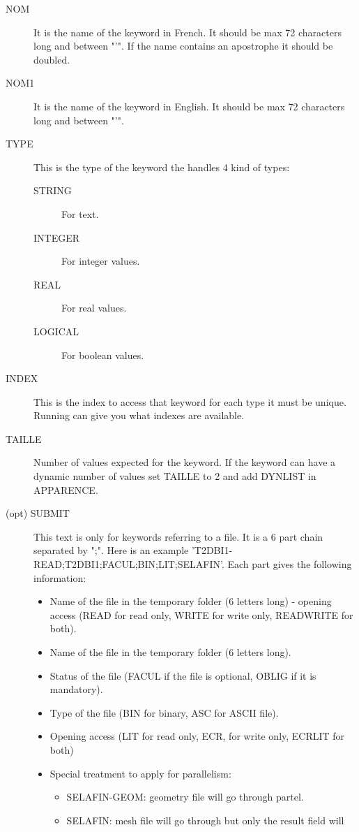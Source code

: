 \begin{description}
\item[NOM] It is the name of the keyword in French. It should be max 72
  characters long and between "'". If the name contains an apostrophe it should
  be doubled.
\item[NOM1] It is the name of the keyword in English. It should be max 72
  characters long and between "'".
\item[TYPE] This is the type of the keyword the \telemacsystem handles 4 kind of types:
  \begin{description}
    \item[STRING] For text.
    \item[INTEGER] For integer values.
    \item[REAL] For real values.
    \item[LOGICAL] For boolean values.
  \end{description}
\item[INDEX] This is the index to access that keyword for each type it must be
  unique. Running \damocles can give you what indexes are available.
\item[TAILLE] Number of values expected for the keyword. If the keyword can
  have a dynamic number of values set TAILLE to 2 and add DYNLIST in APPARENCE.
\item[(opt) SUBMIT] This text is only for keywords referring to a file. It is a
  6 part chain separated by ";". Here is an example
  'T2DBI1-READ;T2DBI1;FACUL;BIN;LIT;SELAFIN'. Each part gives the following
  information:
  \begin{itemize}
    \item Name of the file in the temporary folder (6 letters long) - opening
      access (READ for read only, WRITE for write only, READWRITE for both).
    \item Name of the file in the temporary folder (6 letters long).
    \item Status of the file (FACUL if the file is optional, OBLIG if it is mandatory).
    \item Type of the file (BIN for binary, ASC for ASCII file).
    \item Opening access (LIT for read only, ECR, for write only, ECRLIT for both)
    \item Special treatment to apply for parallelism:
      \begin{itemize}
        \item SELAFIN-GEOM: geometry file will go through partel.
        \item SELAFIN: mesh file will go through but only the result field will

\end{itemize}
\end{itemize}
\end{description}
